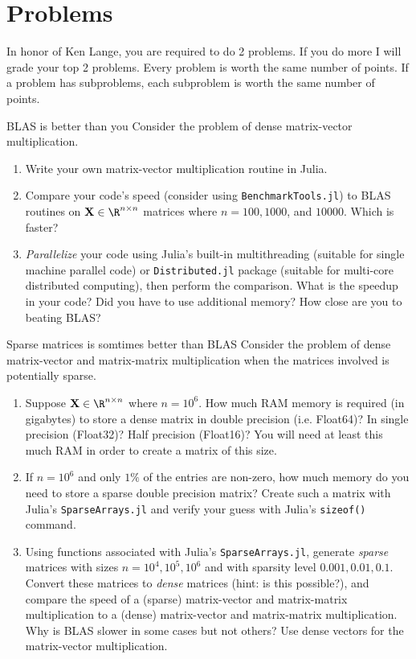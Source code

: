 \documentclass[./some_latex_template.tex]{subfiles}
\begin{document}
\section{Problems}
In honor of Ken Lange, you are required to do 2 problems. If you do more I will grade your top 2 problems. Every problem is worth the same number of points. If a problem has subproblems, each subproblem is worth the same number of points.

\begin{problembox}{{BLAS is better than you}}{}
Consider the problem of dense matrix-vector multiplication. 
\begin{enumerate}
	\item Write your own matrix-vector multiplication routine in Julia.
	\item Compare your code's speed (consider using \texttt{BenchmarkTools.jl}) to BLAS routines on $\bX \in \R^{n \times n}$ matrices where $n = 100, 1000$, and $10000$. Which is faster?
	\item \textit{Parallelize} your code using Julia's built-in multithreading (suitable for single machine parallel code) or \texttt{Distributed.jl} package (suitable for multi-core distributed computing), then perform the comparison. What is the speedup in your code? Did you have to use additional memory? How close are you to beating BLAS?
\end{enumerate}
\end{problembox}

\begin{problembox}{Sparse matrices is somtimes better than BLAS}{}
Consider the problem of dense matrix-vector and matrix-matrix multiplication when the matrices involved is potentially sparse. 
\begin{enumerate}
	\item Suppose $\bX \in \R^{n \times n}$ where $n = 10^6$. How much RAM  memory is required (in gigabytes) to store a dense matrix in double precision (i.e. Float64)? In single precision (Float32)? Half precision (Float16)? You will need at least this much RAM in order to create a matrix of this size. 
	\item If $n = 10^6$ and only $1\%$ of the entries are non-zero, how much memory do you need to store a sparse double precision matrix? Create such a matrix with Julia's \texttt{SparseArrays.jl} and verify your guess with Julia's \texttt{sizeof()} command. 
	\item Using functions associated with Julia's \texttt{SparseArrays.jl}, generate \textit{sparse} matrices with sizes $n = 10^4, 10^5, 10^6$ and with sparsity level $0.001, 0.01, 0.1$. Convert these matrices to \textit{dense} matrices (hint: is this possible?), and compare the speed of a (sparse) matrix-vector and matrix-matrix multiplication to a (dense) matrix-vector and matrix-matrix multiplication. Why is BLAS slower in some cases but not others? Use dense vectors for the matrix-vector multiplication. 
\end{enumerate}
\end{problembox}
\end{document}
